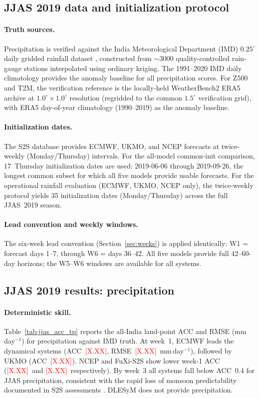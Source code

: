 \documentclass[11pt,a4paper]{article}
\newcommand{\phnum}{\textcolor{red}{[X.XX]}}
\begin{document}
\subsection{JJAS 2019 data and initialization protocol}\label{sec:jjas_data}

\paragraph{Truth sources.}
Precipitation is verified against the India Meteorological Department (IMD)
$0.25^\circ$ daily gridded rainfall dataset \citep{pai2014}, constructed from
$\sim$3000 quality-controlled rain-gauge stations interpolated using ordinary
kriging. The 1991--2020 IMD daily climatology provides the anomaly baseline for
all precipitation scores. For Z500 and T2M, the verification reference is the
locally-held WeatherBench2 ERA5 archive \citep{rasp2024} at
$1.0^\circ\times1.0^\circ$ resolution (regridded to the common $1.5^\circ$
verification grid), with ERA5 day-of-year climatology (1990--2019) as the
anomaly baseline.

\paragraph{Initialization dates.}
The S2S database provides ECMWF, UKMO, and NCEP forecasts at twice-weekly
(Monday/Thursday) intervals. For the all-model common-init comparison,
17~Thursday initialization dates are used: 2019-06-06 through 2019-09-26,
the longest common subset for which all five models provide usable forecasts.
For the operational rainfall evaluation (ECMWF, UKMO, NCEP only), the twice-weekly
protocol yields 35 initialization dates (Monday/Thursday) across the full
JJAS~2019 season.

\paragraph{Lead convention and weekly windows.}
The six-week lead convention (Section~\ref{sec:weeks}) is applied identically:
W1 = forecast days 1--7, through W6 = days 36--42. All five models provide full
42--60-day horizons; the W5--W6 windows are available for all systems.

\subsection{JJAS 2019 results: precipitation}\label{sec:jjas_precip}

\paragraph{Deterministic skill.}
Table~\ref{tab:jjas_acc_tp} reports the all-India land-point ACC and RMSE
(mm\,day$^{-1}$) for precipitation against IMD truth. At week~1, ECMWF leads
the dynamical systems (ACC~\phnum, RMSE~\phnum~mm\,day$^{-1}$), followed by
UKMO (ACC~\phnum). NCEP and FuXi-S2S show lower week-1 ACC (\phnum\ and \phnum\
respectively). By week~3 all systems fall below ACC~0.4 for JJAS precipitation,
consistent with the rapid loss of monsoon predictability documented in S2S
assessments \citep{deandrade2019,lee2020}. DLESyM does not provide precipitation.
\end{document}
